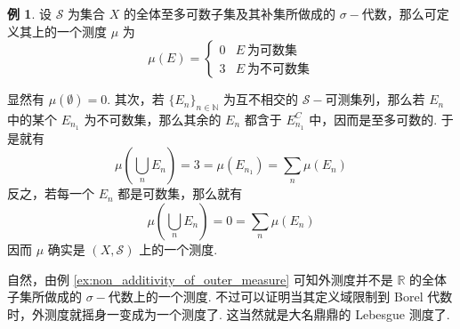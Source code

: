 \documentclass[12pt, a4paper, oneside]{book}
\numberwithin{figure}{section}
\theoremstyle{definition}
\newtheorem{example}[theorem]{例}
\begin{document}
\begin{example}
    设 $\mathcal S$ 为集合 $X$ 的全体至多可数子集及其补集所做成的 $\sigma-$代数，那么可定义其上的一个测度 $\mu$ 为 
    \begin{equation}
        \mu(E) = \begin{cases}
            0&E\ \text{为可数集}\\
            3&E\ \text{为不可数集}
        \end{cases}
    \end{equation}
\end{example}

显然有 $\mu(\emptyset)=0.$ 其次，若 $\{E_n\}_{n\in\mathbb N}$ 为互不相交的 $\mathcal S-$可测集列，那么若 $E_n$ 中的某个 $E_{n_1}$ 为不可数集，那么其余的 $E_n$ 都含于 $E_{n_1}^C$ 中，因而是至多可数的. 于是就有
\begin{equation}
    \mu\left(\bigcup_n E_n\right) = 3 = \mu(E_{n_1})= \sum_n \mu(E_n)
\end{equation}
反之，若每一个 $E_n$ 都是可数集，那么就有
\begin{equation}
    \mu\left(\bigcup_n E_n\right) = 0 = \sum_n \mu(E_n)
\end{equation}
因而 $\mu$ 确实是 $(X,\mathcal S)$ 上的一个测度.

自然，由例 \eqref{ex:non_additivity_of_outer_measure} 可知外测度并不是 $\mathbb R$ 的全体子集所做成的 $\sigma-$代数上的一个测度. 
不过可以证明当其定义域限制到 Borel 代数时，外测度就摇身一变成为一个测度了. 这当然就是大名鼎鼎的 Lebesgue 测度了.

\nocite{*}


\end{document}
